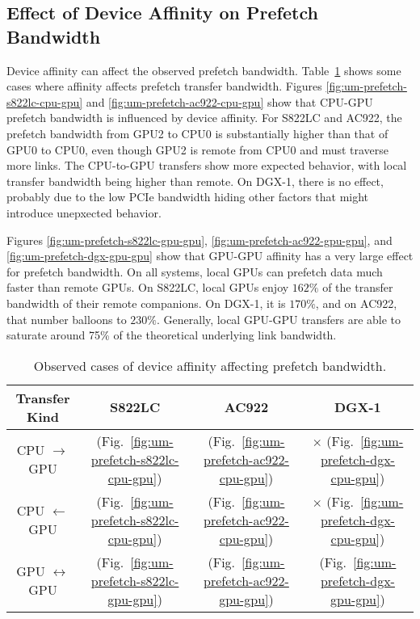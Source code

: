 \subsection{Effect of Device Affinity on Prefetch Bandwidth}

Device affinity can affect the observed prefetch bandwidth.
Table~\ref{tab:um-prefetch-affinity} shows some cases where affinity affects prefetch transfer bandwidth.
Figures \ref{fig:um-prefetch-s822lc-cpu-gpu} and \ref{fig:um-prefetch-ac922-cpu-gpu} show that CPU-GPU prefetch bandwidth is influenced by device affinity.
For S822LC and AC922, the prefetch bandwidth from GPU2 to CPU0 is substantially higher than that of GPU0 to CPU0, even though GPU2 is remote from CPU0 and must traverse more links.
The CPU-to-GPU transfers show more expected behavior, with local transfer bandwidth being higher than remote.
On DGX-1, there is no effect, probably due to the low PCIe bandwidth hiding other factors that might introduce unepxected behavior.

Figures \ref{fig:um-prefetch-s822lc-gpu-gpu}, \ref{fig:um-prefetch-ac922-gpu-gpu}, and \ref{fig:um-prefetch-dgx-gpu-gpu} show that GPU-GPU affinity has a very large effect for prefetch bandwidth.
On all systems, local GPUs can prefetch data much faster than remote GPUs.
On S822LC, local GPUs enjoy $162\%$ of the transfer bandwidth of their remote companions.
On DGX-1, it is $170\%$, and on AC922, that number balloons to $230\%$.
Generally, local GPU-GPU transfers are able to saturate around 75\% of the theoretical underlying link bandwidth.

\begin{table}[ht]
	\centering
	\caption[Device Affinity and prefetch Bandwidth]{
		Observed cases of device affinity affecting prefetch bandwidth.
	}
	\label{tab:um-prefetch-affinity}
	\begin{tabular}{cccc}
		\hline
		\textbf{Transfer Kind}    & \textbf{S822LC}                                        & \textbf{AC922}                                        & \textbf{DGX-1}                                      \\ \hline 
		CPU $\rightarrow$     GPU & \checkmark (Fig.~\ref{fig:um-prefetch-s822lc-cpu-gpu}) & \checkmark (Fig.~\ref{fig:um-prefetch-ac922-cpu-gpu}) & $\times$   (Fig.~\ref{fig:um-prefetch-dgx-cpu-gpu}) \\ \hline
		CPU $\leftarrow$      GPU & \checkmark (Fig.~\ref{fig:um-prefetch-s822lc-cpu-gpu}) & \checkmark (Fig.~\ref{fig:um-prefetch-ac922-cpu-gpu}) & $\times$   (Fig.~\ref{fig:um-prefetch-dgx-cpu-gpu}) \\ \hline
		GPU $\leftrightarrow$ GPU & \checkmark (Fig.~\ref{fig:um-prefetch-s822lc-gpu-gpu}) & \checkmark (Fig.~\ref{fig:um-prefetch-ac922-gpu-gpu}) & \checkmark (Fig.~\ref{fig:um-prefetch-dgx-gpu-gpu}) \\ \hline
	\end{tabular}
\end{table}

